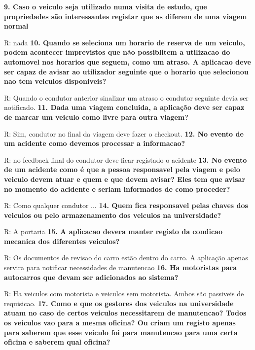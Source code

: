 \documentclass[11pt,a4paper]{report}%
\begin{document}
\textbf{9. Caso o veiculo seja utilizado numa visita de estudo, que propriedades são interessantes registar que as diferem de uma viagem normal}
  
R: nada
\newline
\textbf{10. Quando se seleciona um horario de reserva de um veiculo, podem acontecer imprevistos que não possiblitem a utilizacao do automovel nos horarios que seguem, como um atraso. A aplicacao deve ser capaz de avisar ao utilizador seguinte que o horario que selecionou nao tem veiculos disponiveis?}

R: Quando o condutor anterior sinalizar um atraso o condutor seguinte devia ser notificado.
\newpage
\textbf{11. Dada uma viagem concluida, a aplicação deve ser capaz de marcar um veiculo como livre para outra viagem?}

R: Sim, condutor no final da viagem deve fazer o checkout.
\newline
\textbf{12. No evento de um acidente como devemos processar a informacao?}

R: no feedback final do condutor deve ficar registado o acidente
\newline
\textbf{13. No evento de um acidente como é que a pessoa responsavel pela viagem e pelo veiculo devem atuar e quem e que devem avisar? Eles tem que avisar no momento do acidente e seriam informados de como proceder?} 

R: Como qualquer condutor ...
\newline
\textbf{14. Quem fica responsavel pelas chaves dos veiculos ou pelo armazenamento dos veiculos na universidade?}

R: A portaria
\newline
\textbf{15. A aplicacao devera manter registo da condicao mecanica dos diferentes veiculos?}

R: Os documentos de revisao do carro estão dentro do carro.
A aplicação apenas servira para notificar necessidades de manutencao
\newline
\textbf{16. Ha motoristas para autocarros que devam ser adicionados ao sistema?}

R: Ha veiculos com motorista e veiculos sem motorista. Ambos são passiveis de requisicao.
\newline
\textbf{17. Como e que os gestores dos veiculos na universidade atuam no caso de certos veiculos necessitarem de manutencao? Todos os veiculos vao para a mesma oficina? Ou criam um registo apenas para saberem que esse veiculo foi para manutencao para uma certa oficina e saberem qual oficina?}
\end{document}
